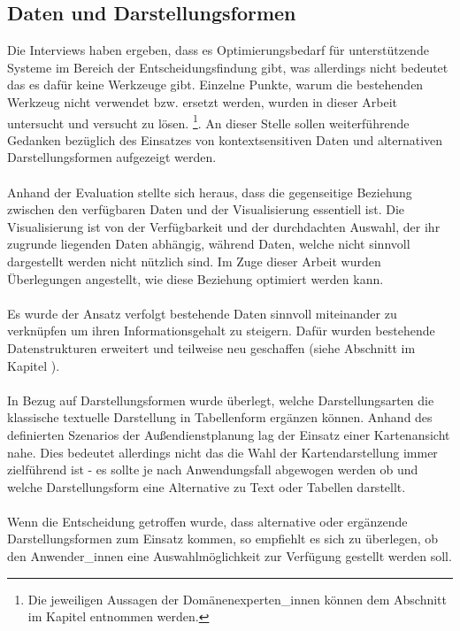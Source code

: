 \documentclass[Bachelorarbeit.tex]{subfiles}
\begin{document}
\subsection*{Daten und Darstellungsformen}
Die Interviews haben ergeben, dass es Optimierungsbedarf für unterstützende Systeme im Bereich der Entscheidungsfindung gibt, was allerdings nicht bedeutet das es dafür keine Werkzeuge gibt.
Einzelne Punkte, warum die bestehenden Werkzeug nicht verwendet bzw. ersetzt werden, wurden in dieser Arbeit untersucht und versucht zu lösen.
\footnote{Die jeweiligen Aussagen der Domänenexperten\_innen können dem Abschnitt  im Kapitel  entnommen werden.}.
An dieser Stelle sollen weiterführende Gedanken bezüglich des Einsatzes von kontextsensitiven Daten und alternativen Darstellungsformen aufgezeigt werden.\\
\\
Anhand der Evaluation stellte sich heraus, dass die gegenseitige Beziehung zwischen den verfügbaren Daten und der Visualisierung essentiell ist.
Die Visualisierung ist von der Verfügbarkeit und der durchdachten Auswahl, der ihr zugrunde liegenden Daten abhängig, während Daten, welche nicht sinnvoll dargestellt werden nicht nützlich sind. 
Im Zuge dieser Arbeit wurden Überlegungen angestellt, wie diese Beziehung optimiert werden kann. \\
\\
Es wurde der Ansatz verfolgt bestehende Daten sinnvoll miteinander zu verknüpfen um ihren Informationsgehalt zu steigern. 
Dafür wurden bestehende Datenstrukturen erweitert und teilweise neu geschaffen (siehe Abschnitt  im Kapitel ).\\
\\
In Bezug auf Darstellungsformen wurde überlegt, welche Darstellungsarten die klassische textuelle Darstellung in Tabellenform ergänzen können.
Anhand des definierten Szenarios der Außendienstplanung lag der Einsatz einer Kartenansicht nahe.
Dies bedeutet allerdings nicht das die Wahl der Kartendarstellung immer zielführend ist - es sollte je nach Anwendungsfall abgewogen werden ob und welche Darstellungsform eine Alternative zu Text oder Tabellen darstellt.\\
\\
Wenn die Entscheidung getroffen wurde, dass alternative oder ergänzende Darstellungsformen zum Einsatz kommen, so empfiehlt es sich zu überlegen, ob den Anwender\_innen eine Auswahlmöglichkeit zur Verfügung gestellt werden soll. 
\end{document}
